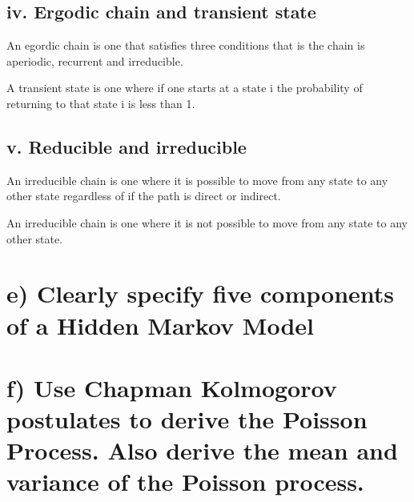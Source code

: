 \documentclass[
]{article}
\begin{document}
\hypertarget{iv.-ergodic-chain-and-transient-state}{%
\subsection{iv. Ergodic chain and transient
state}\label{iv.-ergodic-chain-and-transient-state}}

An egordic chain is one that satisfies three conditions that is the
chain is aperiodic, recurrent and irreducible.

A transient state is one where if one starts at a state i the
probability of returning to that state i is less than 1.

\hypertarget{v.-reducible-and-irreducible}{%
\subsection{v. Reducible and
irreducible}\label{v.-reducible-and-irreducible}}

An irreducible chain is one where it is possible to move from any state
to any other state regardless of if the path is direct or indirect.

An irreducible chain is one where it is not possible to move from any
state to any other state.

\hypertarget{e-clearly-specify-five-components-of-a-hidden-markov-model}{%
\section{e) Clearly specify five components of a Hidden Markov
Model}\label{e-clearly-specify-five-components-of-a-hidden-markov-model}}

\hypertarget{f-use-chapman-kolmogorov-postulates-to-derive-the-poisson-process.-also-derive-the-mean-and-variance-of-the-poisson-process.}{%
\section{f) Use Chapman Kolmogorov postulates to derive the Poisson
Process. Also derive the mean and variance of the Poisson
process.}\label{f-use-chapman-kolmogorov-postulates-to-derive-the-poisson-process.-also-derive-the-mean-and-variance-of-the-poisson-process.}}
\end{document}
